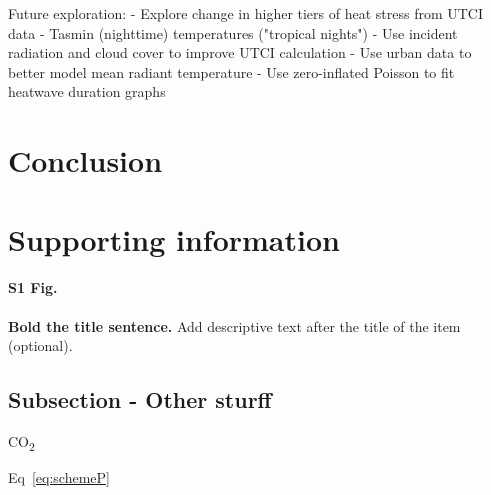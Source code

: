 \documentclass[10pt,letterpaper]{article}
\begin{document}
Future exploration:
- Explore change in higher tiers of heat stress from UTCI data
- Tasmin (nighttime) temperatures ("tropical nights")
- Use incident radiation and cloud cover to improve UTCI calculation
- Use urban data to better model mean radiant temperature
- Use zero-inflated Poisson to fit heatwave duration graphs


\section*{Conclusion}




\cite{Askew2020}






\pagebreak










\pagebreak
\section*{Supporting information}
\paragraph*{S1 Fig.}
\label{S1_Fig}
{\bf Bold the title sentence.} Add descriptive text after the title of the item (optional).



\subsection*{Subsection - Other sturff}



CO\textsubscript{2}


Eq~\ref{eq:schemeP}
\end{document}
